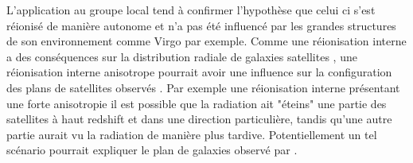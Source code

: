L'application au groupe local tend à confirmer l'hypothèse que celui ci s'est réionisé de manière autonome et n'a pas été influencé par les grandes structures de son environnement comme Virgo par exemple.
Comme une réionisation interne a des conséquences sur la distribution radiale de galaxies satellites \citep{2011MNRAS.417L..93O}, une réionisation interne anisotrope pourrait avoir une influence sur la configuration des plans de satellites observés \citep{2015ApJ...800...34G}.
Par exemple une réionisation interne présentant une forte anisotropie il est possible que la radiation ait "éteins" une partie des satellites à haut redshift et dans une direction particulière, tandis qu'une autre partie aurait vu la radiation de manière plus tardive.
Potentiellement un tel scénario pourrait expliquer le plan de galaxies observé par \cite{2014Natur.511..563I}.